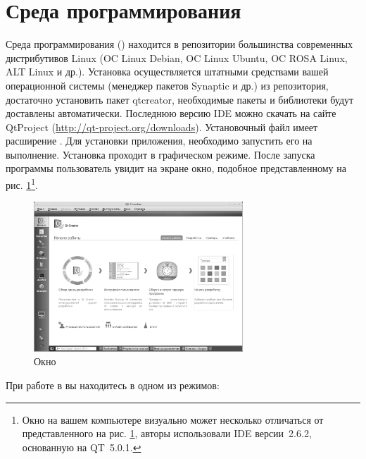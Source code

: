 \section[Среда программирования \Sys{Qt Creator}]{Среда программирования }
Среда программирования  
() находится в репозитории
большинства современных дистрибутивов Linux (OC Linux Debian, OC Linux Ubuntu, OC ROSA Linux, ALT Linux и др.).
Установка осуществляется штатными средствами вашей операционной системы (менеджер пакетов Synaptic и др.) из
репозитория, достаточно установить пакет qtcreator, необходимые пакеты и библиотеки будут доставлены  автоматически.
Последнюю версию IDE  можно скачать на сайте QtProject (\url{http://qt-project.org/downloads}). 
Установочный файл имеет расширение . Для установки приложения, необходимо запустить его на выполнение.
Установка проходит в графическом режиме. После запуска программы пользователь увидит на экране окно, подобное
представленному на рис. \ref{ch01:refDrawing0}\footnote{Окно на вашем компьютере визуально может несколько отличаться от
представленного на рис. \ref{ch01:refDrawing0}, авторы использовали IDE  версии~2.6.2, основанную на QT~5.0.1.}.


\begin{figure}[htb]
\begin{center}
\includegraphics[width=0.7\textwidth]{img/ris_1_1_rus}
\caption{Окно }
\label{ch01:refDrawing0}
\end{center}
\end{figure}
При работе в  вы находитесь в одном из режимов:

